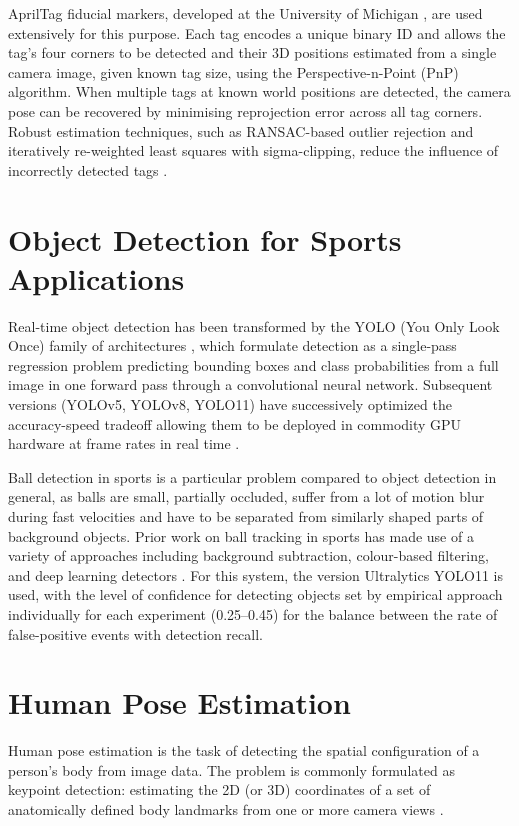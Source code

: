 AprilTag fiducial markers, developed at the University of Michigan \cite{ref11}, are used extensively for this purpose. Each tag encodes a unique binary ID and allows the tag's four corners to be detected and their 3D positions estimated from a single camera image, given known tag size, using the Perspective-n-Point (PnP) algorithm. When multiple tags at known world positions are detected, the camera pose can be recovered by minimising reprojection error across all tag corners. Robust estimation techniques, such as RANSAC-based outlier rejection and iteratively re-weighted least squares with sigma-clipping, reduce the influence of incorrectly detected tags \cite{ref12}.

\section{Object Detection for Sports Applications}

Real-time object detection has been transformed by the YOLO (You Only Look Once) family of architectures \cite{ref13}, which formulate detection as a single-pass regression problem predicting bounding boxes and class probabilities from a full image in one forward pass through a convolutional neural network. Subsequent versions (YOLOv5, YOLOv8, YOLO11) have successively optimized the accuracy-speed tradeoff allowing them to be deployed in commodity GPU hardware at frame rates in real time \cite{ref14}.

Ball detection in sports is a particular problem compared to object detection in general, as balls are small, partially occluded, suffer from a lot of motion blur during fast velocities and have to be separated from similarly shaped parts of background objects. Prior work on ball tracking in sports has made use of a variety of approaches including background subtraction, colour-based filtering, and deep learning detectors \cite{ref5, ref6}. For this system, the version Ultralytics YOLO11 is used, with the level of confidence for detecting objects set by empirical approach individually for each experiment (0.25--0.45) for the balance between the rate of false-positive events with detection recall.

\section{Human Pose Estimation}

Human pose estimation is the task of detecting the spatial configuration of a person's body from image data. The problem is commonly formulated as keypoint detection: estimating the 2D (or 3D) coordinates of a set of anatomically defined body landmarks from one or more camera views \cite{ref15}.


